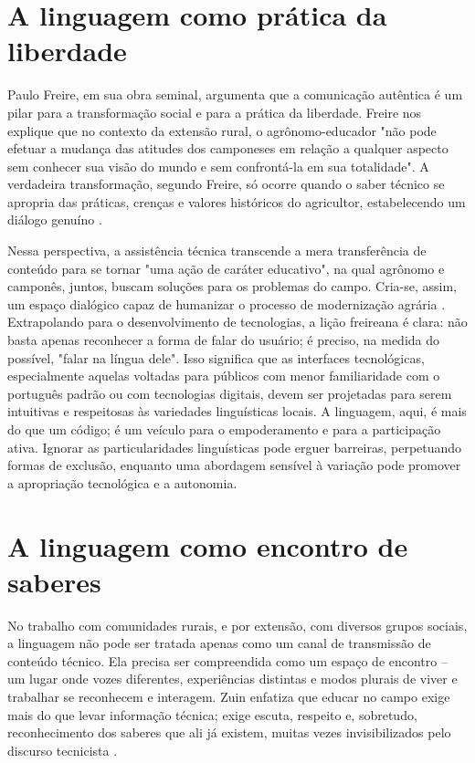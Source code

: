 \section{A linguagem como prática da liberdade}


Paulo Freire, em sua obra seminal, argumenta que a comunicação autêntica é um pilar para a transformação social e para a prática da liberdade. Freire nos explique que no contexto da extensão rural, o agrônomo-educador "não pode efetuar a mudança das atitudes dos camponeses em relação a qualquer aspecto sem conhecer sua visão do mundo e sem confrontá-la em sua totalidade". A verdadeira transformação, segundo Freire, só ocorre quando o saber técnico se apropria das práticas, crenças e valores históricos do agricultor, estabelecendo um diálogo genuíno \cite{freire2013extensao}.

Nessa perspectiva, a assistência técnica transcende a mera transferência de conteúdo para se tornar "uma ação de caráter educativo", na qual agrônomo e camponês, juntos, buscam soluções para os problemas do campo. Cria-se, assim, um espaço dialógico capaz de humanizar o processo de modernização agrária \cite{freire2013extensao}. Extrapolando para o desenvolvimento de tecnologias, a lição freireana é clara: não basta apenas reconhecer a forma de falar do usuário; é preciso, na medida do possível, "falar na língua dele". Isso significa que as interfaces tecnológicas, especialmente aquelas voltadas para públicos com menor familiaridade com o português padrão ou com tecnologias digitais, devem ser projetadas para serem intuitivas e respeitosas às variedades linguísticas locais. A linguagem, aqui, é mais do que um código; é um veículo para o empoderamento e para a participação ativa. Ignorar as particularidades linguísticas pode erguer barreiras, perpetuando formas de exclusão, enquanto uma abordagem sensível à variação pode promover a apropriação tecnológica e a autonomia.


\section{A linguagem como encontro de saberes}
No trabalho com comunidades rurais, e por extensão, com diversos grupos sociais, a linguagem não pode ser tratada apenas como um canal de transmissão de conteúdo técnico. Ela precisa ser compreendida como um espaço de encontro – um lugar onde vozes diferentes, experiências distintas e modos plurais de viver e trabalhar se reconhecem e interagem. Zuin enfatiza que educar no campo exige mais do que levar informação técnica; exige escuta, respeito e, sobretudo, reconhecimento dos saberes que ali já existem, muitas vezes invisibilizados pelo discurso tecnicista \cite{zuin2021comunicacao}.

